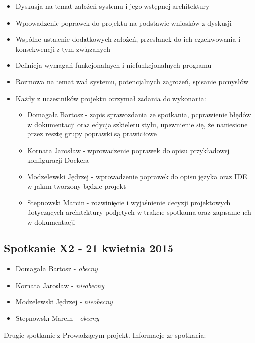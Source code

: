 \begin{itemize}
\item Dyskusja na temat założeń systemu i jego wstępnej architektury
\item Wprowadzenie poprawek do projektu na podstawie wniosków z dyskusji
\item Wspólne ustalenie dodatkowych założeń, przesłanek do ich egzekwowania i konsekwencji z tym związanych
\item Definicja wymagań funkcjonalnych i niefunkcjonalnych programu
\item Rozmowa na temat wad systemu, potencjalnych zagrożeń, spisanie pomysłów

\item Każdy z uczestników projektu otrzymał zadania do wykonania:
\begin{itemize}
\item Domagała Bartosz - zapis sprawozdania ze spotkania, poprawienie błędów w dokumentacji oraz edycja szkieletu stylu, upewnienie się, że naniesione przez resztę grupy poprawki są prawidłowe
\item Kornata Jarosław - wprowadzenie poprawek do opisu przykładowej konfiguracji Dockera
\item Modzelewski Jędrzej - wprowadzenie poprawek do opisu języka oraz IDE w jakim tworzony będzie projekt
\item Stepnowski Marcin - rozwinięcie i wyjaśnienie decyzji projektowych dotyczących architektury podjętych w trakcie spotkania oraz zapisanie ich w dokumentacji
\end{itemize}
\end{itemize}


\subsection[Spotkanie X2 - 21 kwietnia 2015]{Spotkanie X2 - 21 kwietnia 2015}

\begin{itemize}
\item Domagała Bartosz - \textit{obecny}
\item Kornata Jarosław - \textit{nieobecny}
\item Modzelewski Jędrzej - \textit{nieobecny}
\item Stepnowski Marcin - \textit{obecny}
\end{itemize}

\par{Drugie spotkanie z Prowadzącym projekt. Informacje ze spotkania:}

